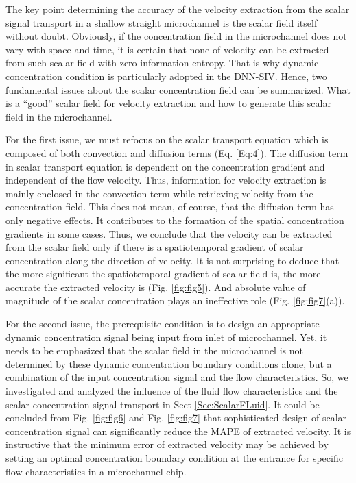 \documentclass{article}
\begin{document}
The key point determining the accuracy of the velocity extraction from the scalar signal transport in a shallow straight microchannel is the scalar field itself without doubt. Obviously, if the concentration field in the microchannel does not vary with space and time, it is certain that none of velocity can be extracted from such scalar field with zero information entropy. That is why dynamic concentration condition is particularly adopted in the DNN-SIV. Hence, two fundamental issues about the scalar concentration field can be summarized. What is a ``good'' scalar field for velocity extraction and how to generate this scalar field in the microchannel.\par

For the first issue, we must refocus on the scalar transport equation which is composed of both convection and diffusion terms (Eq. \ref{Eq:4}). The diffusion term in scalar transport equation is dependent on the concentration gradient and independent of the flow velocity. Thus, information for velocity extraction is mainly enclosed in the convection term while retrieving velocity from the concentration field. This does not mean, of course, that the diffusion term has only negative effects. It contributes to the formation of the spatial concentration gradients in some cases. Thus, we conclude that the velocity can be extracted from the scalar field only if there is a spatiotemporal gradient of scalar concentration along the direction of velocity. It is not surprising to deduce that the more significant the spatiotemporal gradient of scalar field is, the more accurate the extracted velocity is (Fig. \ref{fig:fig5}). And absolute value of magnitude of the scalar concentration plays an ineffective role (Fig. \ref{fig:fig7}(a)).\par

For the second issue, the prerequisite condition is to design an appropriate dynamic concentration signal being input from inlet of microchannel. Yet, it needs to be emphasized that the scalar field in the microchannel is not determined by these dynamic concentration boundary conditions alone, but a combination of the input concentration signal and the flow characteristics. So, we investigated and analyzed the influence of the fluid flow characteristics and the scalar concentration signal transport in Sect \ref{Sec:ScalarFLuid}. It could be concluded from Fig. \ref{fig:fig6} and Fig. \ref{fig:fig7} that sophisticated design of scalar concentration signal can significantly reduce the MAPE of extracted velocity. It is instructive that the minimum error of extracted velocity may be achieved by setting an optimal concentration boundary condition at the entrance for specific flow characteristics in a microchannel chip.\par
\end{document}
